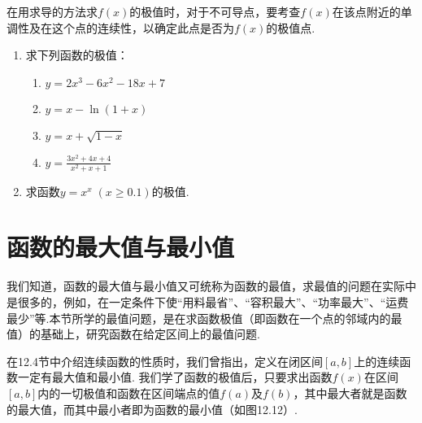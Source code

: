 \begin{rmk}
    在用求导的方法求$f(x)$的极值时，对于不可导点，要考查$f(x)$在该点附近的单调性及在这个点的连续性，以确定此点是否为$f(x)$的极值点.
\end{rmk}


\begin{ex}
\begin{enumerate}
    \item 求下列函数的极值：
\begin{multicols}{2}
\begin{enumerate}[(1)]
\item $y=2x^3-6x^2-18x+7$
\item $y=x-\ln(1+x)$
\item $y=x+\sqrt{1-x}$
\item $y=\frac{3x^2+4x+4}{x^2+x+1}$
\end{enumerate}
\end{multicols}

    \item 求函数$y=x^x\; (x\ge 0.1)$的极值.
\end{enumerate}
\end{ex}

\section{函数的最大值与最小值}
我们知道，函数的最大值与最小值又可统称为函数的最值，求最值的问题在实际中是很多的，例如，在一定条件下使“用料最省”、“容积最大”、“功率最大”、“运费最少”等.本节所学的最值问题，是在求函数极值（即函数在一个点的邻域内的最值）的基础上，研究函数在给定区间上的最值问题.

在12.4节中介绍连续函数的性质时，我们曾指出，定义在闭区间$[a,b]$上的连续函数一定有最大值和最小值. 我们学了函数的极值后，只要求出函数$f(x)$在区间$[a,b]$内的一切极值和函数在区间端点的值$f(a)$及$f(b)$，其中最大者就是函数的最大值，而其中最小者即为函数的最小值（如图12.12）.

